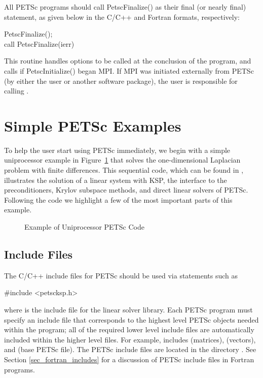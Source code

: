 All PETSc programs should call PetscFinalize()
as their final (or nearly final) statement, as given below in the C/C++
and Fortran formats, respectively:
\begin{tabbing}
  PetscFinalize();\\
  call PetscFinalize(ierr)
\end{tabbing}
This routine handles options to be called at the conclusion of
the program, and calls  
if PetscInitialize()
began MPI. If MPI was initiated externally from PETSc (by either
the user or another software package), the user is
responsible for calling .

\section{Simple PETSc Examples}

\label{sec_simple}

To help the user start using PETSc immediately, we begin with a simple
uniprocessor example in Figure~\ref{fig_example1} that solves the
one-dimensional Laplacian problem with finite differences.  This
sequential code, which can be found in
,
illustrates the solution of a linear system with KSP, the
interface to the preconditioners, Krylov subspace methods, and direct
linear solvers of PETSc.  Following the code we highlight a few of the most important
parts of this example.

\begin{figure}[H]
{\footnotesize
{}
}
\caption{Example of Uniprocessor PETSc Code}
\label{fig_example1}
\end{figure}

\subsection*{Include Files}

The C/C++ include files for PETSc should be used via statements such as
\begin{tabbing}
{\footnotesize
   \#include <petscksp.h>
}
\end{tabbing}
where  is the include file for the linear solver library.
Each PETSc program must specify an
include file that corresponds to the highest level PETSc objects
needed within the program; all of the required lower level include
files are automatically included within the higher level files.  For
example,  includes  (matrices),
 (vectors), and  (base PETSc file).
The PETSc include files are located in the directory
.  See Section \ref{sec_fortran_includes}
for a discussion of PETSc include files in Fortran programs.

